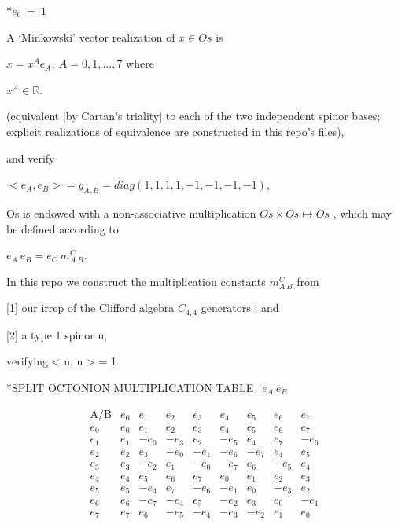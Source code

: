 \documentclass[10pt]{article}
\makeatletter
\newcommand\keepnext{\par\nopagebreak\@nobreaktrue\everypar{\@nobreakfalse\everypar{}}}
\newcommand\mdpart{\@startsection{section}{1}{\z@}{-3.5ex \@plus -1ex \@minus -.2ex}{2.3ex \@plus.2ex}{\normalfont\LARGE\bfseries\raggedright}}
\makeatother
\begin{document}
\mdpart*{$e_0 \  =  \  1$}

A `Minkowski' vector realization of $x \in Os$ is


$x = x^A e_A,  \  A=0, 1, ..., 7$ where\keepnext


$x^A \in \mathbb{R}$.\keepnext



(equivalent [by Cartan's triality] to each of the two independent spinor bases; explicit realizations of equivalence are constructed in this repo's files),


and verify\keepnext


$< e_A, e_B > = g_{A,B} = diag(1,1,1,1,-1,-1,-1,-1)$,\keepnext



Os is endowed with a non-associative multiplication $Os \times Os \mapsto Os$  , which may be defined according to


$e_A \  e_B = e_C \  m^C_{A \  B}$.\keepnext


In this repo we construct the multiplication constants $m^C_{A \  B}$ from


[1] our irrep of the Clifford algebra $C_{4,4}$ generators ; and


[2] a type 1 spinor u,


verifying \textless{} u, u \textgreater{} = 1.




\mdpart*{SPLIT OCTONION MULTIPLICATION TABLE $\   \  e_A \  e_B$}


\[\begin{array}{ccccccccc}
\text{A/B} & e_0 & e_1 & e_2 & e_3 & e_4 & e_5 & e_6 &
e_7 \\
e_0 & e_0 & e_1 & e_2 & e_3 & e_4 & e_5 & e_6 & e_7 \\
e_1 & e_1 & -e_0 & -e_3 & e_2 & -e_5 & e_4 & e_7 & -e_6
\\
e_2 & e_2 & e_3 & -e_0 & -e_1 & -e_6 & -e_7 & e_4 & e_5
\\
e_3 & e_3 & -e_2 & e_1 & -e_0 & -e_7 & e_6 & -e_5 & e_4
\\
e_4 & e_4 & e_5 & e_6 & e_7 & e_0 & e_1 & e_2 & e_3 \\
e_5 & e_5 & -e_4 & e_7 & -e_6 & -e_1 & e_0 & -e_3 & e_2
\\
e_6 & e_6 & -e_7 & -e_4 & e_5 & -e_2 & e_3 & e_0 & -e_1
\\
e_7 & e_7 & e_6 & -e_5 & -e_4 & -e_3 & -e_2 & e_1 & e_0
\\
\end{array}\]
\end{document}
